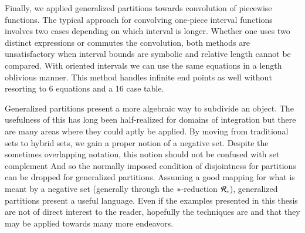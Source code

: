 Finally, we applied generalized partitions towards convolution of piecewise functions.
The typical approach for convolving one-piece interval functions involves two cases depending on which interval is longer.
Whether one uses two distinct expressions or commutes the convolution, 
both methods are unsatisfactory when interval bounds
are symbolic and relative length cannot be compared.
With oriented intervals we can use the same equations in a length oblivious manner.
This method handles infinite end points as well without resorting to 6 equations and a 16 case table.


Generalized partitions present a more algebraic way to subdivide an object.
The usefulness of this has long been half-realized for domains of integration 
but there are many areas where they could aptly be applied.
By moving from traditional sets to hybrid sets, we gain a proper notion of a negative set.
Despite the sometimes overlapping notation, this notion should not be confused with set complement
And so the normally imposed condition of disjointness for partitions can be dropped for generalized partitions.
Assuming a good mapping for what is meant by a negative set (generally through the $\op$-reduction $\R[\op]$),
generalized partitions present a useful language.
Even if the examples presented in this thesis are not of direct interest to the reader, hopefully the techniques are
and that they may be applied towards many more endeavors.









